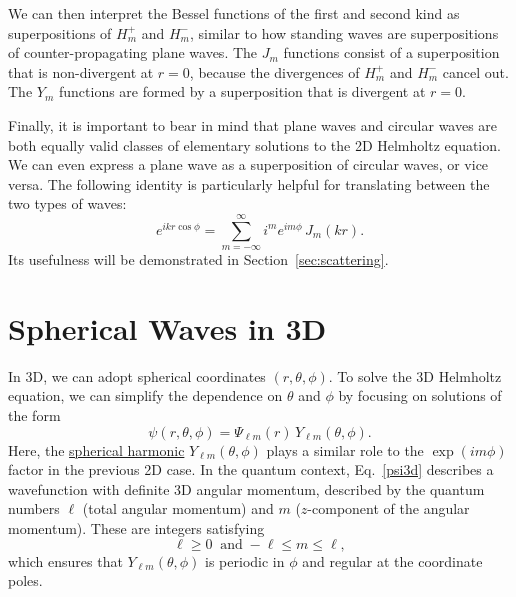 \documentclass[pra,12pt]{revtex4}
\begin{document}
We can then interpret the Bessel functions of the first and second
kind as superpositions of $H_m^+$ and $H_m^-$, similar to how standing
waves are superpositions of counter-propagating plane waves.  The
$J_m$ functions consist of a superposition that is non-divergent at $r
= 0$, because the divergences of $H_m^+$ and $H_m^-$ cancel out.  The
$Y_m$ functions are formed by a superposition that is divergent at $r
= 0$.

Finally, it is important to bear in mind that plane waves and circular
waves are both equally valid classes of elementary solutions to the 2D
Helmholtz equation.  We can even express a plane wave as a
superposition of circular waves, or vice versa.  The following
identity is particularly helpful for translating between the two types
of waves:
\begin{equation}
  e^{ikr\cos\phi} = \sum_{m=-\infty}^\infty i^m e^{im\phi} \, J_m(kr).
  \label{eikrcosphi}
\end{equation}
Its usefulness will be demonstrated in Section~\ref{sec:scattering}.

\section{Spherical Waves in 3D}
\label{sec:spherical}

In 3D, we can adopt spherical coordinates $(r, \theta, \phi)$.  To
solve the 3D Helmholtz equation, we can simplify the dependence on
$\theta$ and $\phi$ by focusing on solutions of the form
\begin{equation}
  \psi(r,\theta,\phi) = \Psi_{\ell m}(r) \,Y_{\ell m}(\theta, \phi).
  \label{psi3d}
\end{equation}
Here, the
\href{https://docs.scipy.org/doc/scipy/reference/generated/scipy.special.sph_harm.html}{spherical
  harmonic} $Y_{\ell m}(\theta,\phi)$ plays a similar role to the
$\exp(im\phi)$ factor in the previous 2D case.  In the quantum
context, Eq.~\eqref{psi3d} describes a wavefunction with definite 3D
angular momentum, described by the quantum numbers $\ell$ (total
angular momentum) and $m$ ($z$-component of the angular momentum).
These are integers satisfying
\begin{equation}
  \ell \ge 0 \;\;\mathrm{and}\; -\ell\le m \le \ell,
\end{equation}
which ensures that $Y_{\ell m}(\theta,\phi)$ is periodic in $\phi$ and
regular at the coordinate poles.
\end{document}
